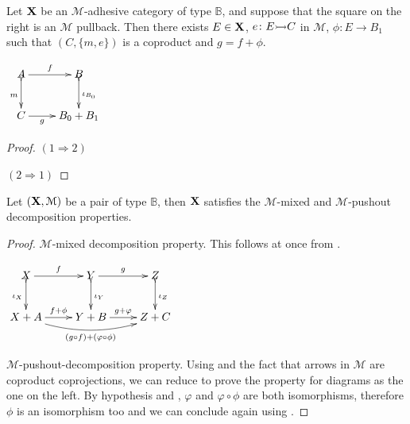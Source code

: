 \documentclass[a4paper,UKenglish,cleveref,pdftex,thm-restate,numberwithinsect]{lipics-v2021}
\newcommand{\mto}[0]{\scalebox{1}{$\rightarrowtail$}}
\def\X{\textbf {\textup{X}}}
\begin{document}
\noindent
\parbox{10.7cm}{\begin{corollary}\label{cor:po2}
Let $\X$ be an $\mathcal{M}$-adhesive category of type $\mathbb{B}$, and suppose that the square on the right is an $\mathcal{M}$ pullback. Then there exists $E\in \X$, $e\colon E\mto C$ in $\mathcal{M}$, $\phi:E\to B_1$ such that $(C, \{m, e\})$ is a coproduct and $g=f+\phi$. 
\end{corollary}} \parbox{3cm}{\vspace{-.5cm}$\xymatrix{A  \ar[r]^{f} \ar@{>->}[d]_{m}& B \ar@{>->}[d]^{\iota_{B_{0}}}\\ C\ar[r]_-{g} & B_0+B_1}$}

\noindent 
\parbox{9.5cm}{\begin{proof}	$(1\Rightarrow 2)$ 
	
	\smallskip \noindent $(2\Rightarrow 1)$
\end{proof}}

\fi 

\begin{lemma}\label{lem:prop} Let $(\X, \mathcal{M})$ be a pair of type $\mathbb{B}$, then $\X$ satisfies the $\mathcal{M}$-mixed and $\mathcal{M}$-pushout decomposition properties.
\end{lemma}
\begin{proof}$\mathcal{M}$-mixed decomposition property. This follows at once from .
	
	\medskip \noindent
	\parbox{3cm}{$\xymatrix{X \ar[r]^f \ar@{>->}[d]_{\iota_X}& Y\ar[r]^g \ar@{>->}[d]^{\iota_Y} & Z\ar@{>->}[d]^{\iota_Z}\\X+A  \ar@/_.4cm/[rr]_{(g\circ f) + (\varphi \circ \phi)}\ar[r]^{f+\phi}& Y+B \ar[r]^{g+\varphi}& Z+C}$} \qquad \qquad  \qquad   \qquad \parbox{8cm}{ $\mathcal{M}$-pushout-decomposition property. Using  and the fact that arrows in $\mathcal{M}$ are coproduct coprojections, we can reduce to prove the property for diagrams as the one on the left. By hypothesis and , $\varphi$ and $\varphi\circ \phi$ are both isomorphisms, therefore $\phi$ is an isomorphism too and we can conclude again using .\qedhere 
}
	
		
\end{proof}
\end{document}
